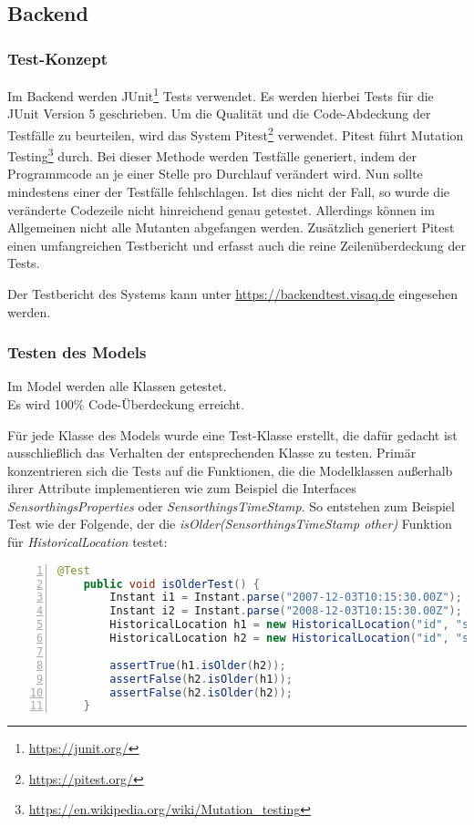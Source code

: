 \subsection{Backend}
\subsubsection{Test-Konzept}
Im Backend werden JUnit\footnote{\url{https://junit.org/}} Tests verwendet. Es werden hierbei Tests für die JUnit Version 5 geschrieben.
Um die Qualität und die Code-Abdeckung der Testfälle zu beurteilen, wird das System Pitest\footnote{\url{https://pitest.org/}} verwendet.
Pitest führt Mutation Testing\footnote{\url{https://en.wikipedia.org/wiki/Mutation_testing}} durch.
Bei dieser Methode werden Testfälle generiert, indem der Programmcode an je einer Stelle pro Durchlauf verändert wird.
Nun sollte mindestens einer der Testfälle fehlschlagen.
Ist dies nicht der Fall, so wurde die veränderte Codezeile nicht hinreichend genau getestet.
Allerdings können im Allgemeinen nicht alle Mutanten abgefangen werden.
Zusätzlich generiert Pitest einen umfangreichen Testbericht und erfasst auch die reine Zeilenüberdeckung der Tests.

Der Testbericht des Systems kann unter \url{https://backendtest.visaq.de} eingesehen werden.

\subsubsection{Testen des Models}
Im Model werden alle Klassen getestet.
\\
Es wird 100\% Code-Überdeckung erreicht.

Für jede Klasse des Models wurde eine Test-Klasse erstellt, die dafür gedacht ist ausschließlich das Verhalten der entsprechenden Klasse zu testen.
Primär konzentrieren sich die Tests auf die Funktionen, die die Modelklassen außerhalb ihrer Attribute implementieren wie zum Beispiel die Interfaces \textit{SensorthingsProperties} oder \textit{SensorthingsTimeStamp}.
So entstehen zum Beispiel Test wie der Folgende, der die \textit{isOlder(SensorthingsTimeStamp other)} Funktion für \textit{HistoricalLocation} testet:
\begin{lstlisting}[language=java,
    basicstyle=\normalfont\ttfamily,
    numbers=left,
    numberstyle=\scriptsize,
    stepnumber=1,
    numbersep=8pt,
    showstringspaces=false,
    breaklines=true,
    frame=lines,
    backgroundcolor=\color{background}]
    @Test
    public void isOlderTest() {
        Instant i1 = Instant.parse("2007-12-03T10:15:30.00Z");
        Instant i2 = Instant.parse("2008-12-03T10:15:30.00Z");
        HistoricalLocation h1 = new HistoricalLocation("id", "selfUrl", false, i1, null, null);
        HistoricalLocation h2 = new HistoricalLocation("id", "selfUrl", false, i2, null, null);

        assertTrue(h1.isOlder(h2));
        assertFalse(h2.isOlder(h1));
        assertFalse(h2.isOlder(h2));
    }
\end{lstlisting}

